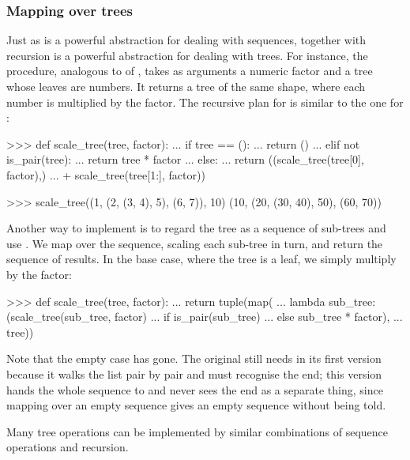 \subsubsection*{Mapping over trees}

Just as  is a powerful abstraction for dealing with sequences,
 together with recursion is a powerful abstraction for dealing with
trees.  For instance, the  procedure, analogous to
 of , takes as arguments a numeric factor
and a tree whose leaves are numbers.  It returns a tree of the same shape,
where each number is multiplied by the factor.  The recursive plan for
 is similar to the one for :

\begin{codeBlock}
>>> def scale_tree(tree, factor):
...     if tree == ():
...         return ()
...     elif not is_pair(tree):
...         return tree * factor
...     else:
...         return ((scale_tree(tree[0], factor),)
...                 + scale_tree(tree[1:], factor))

>>> scale_tree((1, (2, (3, 4), 5), (6, 7)), 10)
(10, (20, (30, 40), 50), (60, 70))
\end{codeBlock}

\noindent
Another way to implement  is to regard the tree as a sequence
of sub-trees and use .  We map over the sequence, scaling each
sub-tree in turn, and return the sequence of results.  In the base case, where
the tree is a leaf, we simply multiply by the factor:

\begin{codeBlock}
>>> def scale_tree(tree, factor):
...     return tuple(map(
...         lambda sub_tree: (scale_tree(sub_tree, factor)
...                           if is_pair(sub_tree)
...                           else sub_tree * factor),
...         tree))
\end{codeBlock}

\noindent
Note that the empty case has gone.  The original still needs  in
its first version because it walks the list pair by pair and must recognise the
end; this version hands the whole sequence to  and never sees the end
as a separate thing, since mapping over an empty sequence gives an empty
sequence without being told.

\noindent
Many tree operations can be implemented by similar combinations of sequence
operations and recursion.

